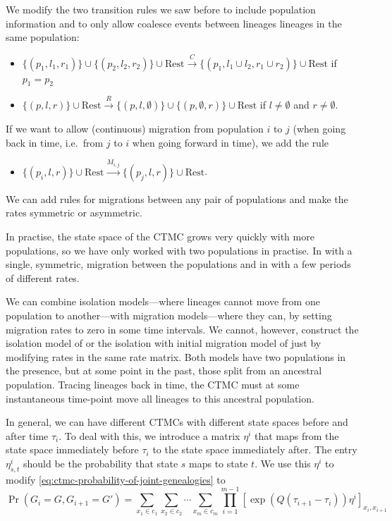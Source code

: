 \documentclass[graybox]{svmult}
\begin{document}
We modify the two transition rules we saw before to include population information and to only allow coalesce events between lineages lineages in the same population:
\begin{itemize}
	\item $\{(p_1,l_1,r_1)\}\cup\{(p_2,l_2,r_2)\}\cup\text{Rest} \overset{C}{\to}\{(p_1,l_1\cup l_2,r_1 \cup r_2)\}\cup\text{Rest}$ if $p_1=p_2$
	\item $\{(p,l,r)\}\cup\text{Rest} \overset{R}{\to} \{(p,l,\emptyset)\}\cup\{(p,\emptyset,r)\}\cup\text{Rest}$ if $l\neq\emptyset$ and $r\neq\emptyset$.
\end{itemize}
If we want to allow (continuous) migration from population $i$ to $j$ (when going back in time, i.e.\ from $j$ to $i$ when going forward in time), we add the rule
\begin{itemize}
	\item $\{(p_i,l,r)\}\cup\text{Rest} \overset{M_{i,j}}{\to} \{(p_j,l,r)\}\cup\text{Rest}$.
\end{itemize}
We can add rules for migrations between any pair of populations and make the rates symmetric or asymmetric.

In practise, the state space of the CTMC grows very quickly with more populations, so we have only worked with two populations in practise. In \citet{Mailund:2012ewa} with a single, symmetric, migration between the populations and in \citet{Cheng:2015kia} with a few periods of different rates.

We can combine isolation models---where lineages cannot move from one population to another---with migration models---where they can, by setting migration rates to zero in some time intervals. We cannot, however, construct the isolation model of \citet{Mailund:2011dva} or the isolation with initial migration model of \citet{Mailund:2012ewa} just by modifying rates in the same rate matrix. Both models have two populations in the presence, but at some point in the past, those split from an ancestral population. Tracing lineages back in time, the CTMC must at some instantaneous time-point move all lineages to this ancestral population.

In general, we can have different CTMCs with different state spaces before and after time $\tau_i$. To deal with this, we introduce a matrix $\eta^i$ that maps from the state space immediately before $\tau_i$ to the state space immediately after. The entry $\eta^i_{s,t}$ should be the probability that state $s$ maps to state $t$. We use this $\eta^i$ to modify \eqref{eq:ctmc-probability-of-joint-genealogies} to
\begin{equation}
	\Pr(G_i=G,G_{i+1}=G') = 
	\sum_{x_1\in c_1}\sum_{x_2\in c_2}\cdots\sum_{x_m\in c_m}
	\prod_{i=1}^{m-1} \left[\exp\left(Q\left(\tau_{i+1}-\tau_i\right)\right)\eta^i\right]_{x_i,x_{i+1}}
\end{equation}
\end{document}
